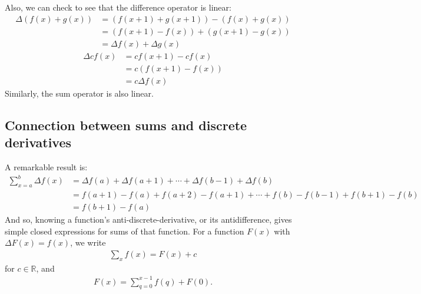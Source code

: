 \documentclass{article}
\renewcommand\({\left(}
\renewcommand\){\right)}
\begin{document}
\vspace{6mm}
Also, we can check to see that the difference operator is linear:
\begin{align*}
    \Delta \left(f(x)+g(x)\right)&=\left(f(x+1)+g(x+1)\right)-\left(f(x)+g(x)\right)\\
    &=\left(f(x+1)-f(x)\right)+\left(g(x+1)-g(x)\right)\\
    &=\Delta f(x)+\Delta g(x)
\end{align*}
\begin{align*}
    \Delta cf(x)&=cf(x+1)-cf(x)\\
    &=c\left(f(x+1)-f(x)\right)\\
    &=c\Delta f(x)
\end{align*}
Similarly, the sum operator is also linear.

\subsection{Connection between sums and discrete derivatives}
A remarkable result is:
\begin{align*}
    \sum_{x=a}^b\Delta f(x)&=\Delta f(a)+\Delta f(a+1)+\cdots+\Delta f(b-1)+\Delta f(b)\\
    &=f(a+1)-f(a)+f(a+2)-f(a+1)+\cdots+f(b)-f(b-1)+f(b+1)-f(b)\\
    &=f(b+1)-f(a)\
\end{align*}
And so, knowing a function's anti-discrete-derivative, or its antidifference, gives simple closed expressions for sums of that function. For a function $F(x)$ with $\Delta F(x)=f(x)$, we write
\begin{align*}
    \sum_{x}f(x)=F(x)+c
\end{align*}
for $c\in\mathbb{R}$, and
\begin{align*}
    F(x)=\sum_{q=0}^{x-1}f(q)+F(0).
\end{align*}
\end{document}
